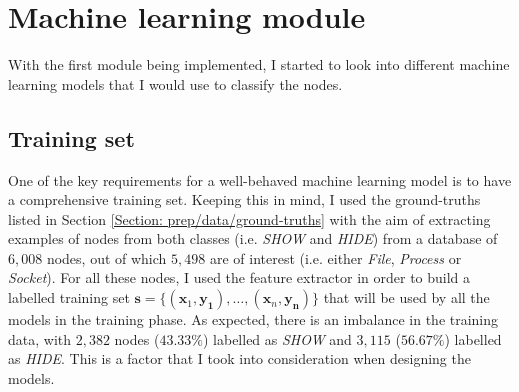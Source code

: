 	\section{Machine learning module} \label{Section: impl/ml}
	With the first module being implemented, I started to look into different machine learning models that I would use to classify the nodes. 
	\subsection{Training set} \label{Section: impl/ml/training-set}
	One of the key requirements for a well-behaved machine learning model is to have a comprehensive training set. Keeping this in mind, I used the ground-truths listed in Section \ref{Section: prep/data/ground-truths} with the aim of extracting examples of nodes from both classes (i.e. \textit{SHOW} and \textit{HIDE}) from a database of $6,008$ nodes, out of which $5,498$ are of interest (i.e. either \textit{File}, \textit{Process} or \textit{Socket}). For all these nodes, I used the feature extractor in order to build a labelled training set $\mathbf{s}=\{ (\mathbf{x}_1, \mathbf{y_1}), \dots, (\mathbf{x}_n, \mathbf{y_n}) \}$ that will be used by all the models in the training phase. As expected, there is an imbalance in the training data, with $2,382$ nodes ($43.33\%$) labelled as \textit{SHOW} and $3,115$ ($56.67\%$) labelled as \textit{HIDE}. This is a factor that I took into consideration when designing the models.
	
